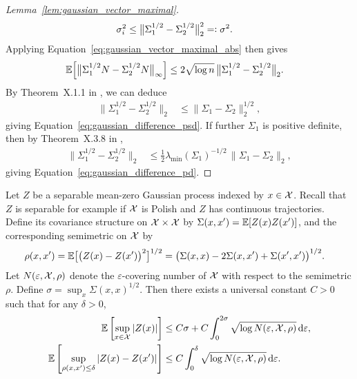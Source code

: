\begin{proof}[Lemma~\ref{lem:gaussian_vector_maximal}]
  \begin{align*}
    \sigma_i^2
    &\leq
    \big\|
    \Sigma_1^{1/2} - \Sigma_2^{1/2}
    \big\|_2^2
    =\vcentcolon
    \sigma^2.
  \end{align*}
  Applying
  Equation~\ref{eq:gaussian_vector_maximal_abs}
  then gives
  \begin{align*}
    \mathbb{E}\Big[
      \big\|
      \Sigma_1^{1/2} N
      - \Sigma_2^{1/2} N
      \big\|_\infty
    \Big]
    &\leq
    2 \sqrt{\log n} \,
    \big\|
    \Sigma_1^{1/2} - \Sigma_2^{1/2}
    \big\|_2.
  \end{align*}
  By Theorem~X.1.1
  in \citet{bhatia1997matrix},
  we can deduce
  \begin{align*}
    \big\|
    \Sigma_1^{1/2} - \Sigma_2^{1/2}
    \big\|_2
    &\leq
    \big\|
    \Sigma_1 - \Sigma_2
    \big\|_2^{1/2},
  \end{align*}
  giving
  Equation~\ref{eq:gaussian_difference_psd}.
  If further $\Sigma_1$
  is positive definite,
  then by
  Theorem~X.3.8 in
  \citet{bhatia1997matrix},
  \begin{align*}
    \big\|
    \Sigma_1^{1/2} - \Sigma_2^{1/2}
    \big\|_2
    &\leq
    \frac{1}{2}
    \lambda_{\min}(\Sigma_1)^{-1/2} \,
    \big\|
    \Sigma_1 - \Sigma_2
    \big\|_2,
  \end{align*}
  giving
  Equation~\ref{eq:gaussian_difference_pd}.
\end{proof}

\begin{lemma}
  \label{lem:gaussian_process_maximal}

  Let $Z$ be a separable
  mean-zero Gaussian process indexed
  by $x \in \mathcal{X}$.
  Recall that $Z$ is separable for example if
  $\mathcal{X}$ is Polish
  and $Z$ has
  continuous trajectories.
  Define its covariance structure on $\mathcal{X} \times \mathcal{X}$
  by $\Sigma(x, x') = \mathbb{E}[Z(x) Z(x')]$,
  and the corresponding semimetric on $\mathcal{X}$
  by
  \begin{align*}
    \rho(x,x')
    &=
    \mathbb{E}\big[\big(Z(x) - Z(x')\big)^2\big]^{1/2}
    = \big(\Sigma(x,x)
      - 2 \Sigma(x,x')
    + \Sigma(x',x')\big)^{1/2}.
  \end{align*}
  Let $N(\varepsilon, \mathcal{X}, \rho)$
  denote the $\varepsilon$-covering number of $\mathcal{X}$
  with respect to the semimetric $\rho$.
  Define $\sigma = \sup_x \Sigma(x,x)^{1/2}$.
  Then there exists a universal constant $C > 0$
  such that for any $\delta > 0$,
  \begin{align*}
    \mathbb{E}\left[
      \sup_{x \in \mathcal{X}}
      |Z(x)|
    \right]
    &\leq
    C \sigma
    + C \int_0^{2\sigma}
    \sqrt{\log N(\varepsilon, \mathcal{X}, \rho)}
    \,\mathrm{d}\varepsilon, \\
    \mathbb{E}\left[
      \sup_{\rho(x,x') \leq \delta}
      |Z(x) - Z(x')|
    \right]
    &\leq
    C \int_0^{\delta}
    \sqrt{\log N(\varepsilon, \mathcal{X}, \rho)}
    \,\mathrm{d}\varepsilon.
  \end{align*}

\end{lemma}

